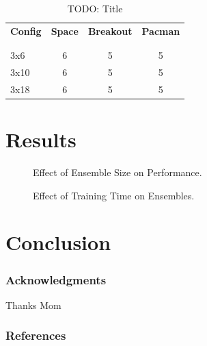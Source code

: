 \documentclass{article} %
\begin{document}
\begin{table}[H]
\caption{TODO: Title}
\label{sample-table}
\begin{center}
    \begin{tabular}{l | ccc}
        {\bf Config} & \multicolumn{1}{c}{\bf Space}  & \multicolumn{1}{c}{\bf Breakout} & \multicolumn{1}{c}{\bf Pacman} \\
        \\ \hline \\
        3x6     &6 &5 &5 \\
        3x10    &6 &5 &5 \\
        3x18    &6 &5 &5 \\
    \end{tabular}
\end{center}
\end{table}


\section{Results}

\begin{figure}[H]
\begin{center}
\fbox{\rule[-.5cm]{0cm}{4cm} \rule[-.5cm]{4cm}{0cm}}
\end{center}
\caption{Effect of Ensemble Size on Performance.}
\end{figure}

\begin{figure}[H]
\begin{center}
\fbox{\rule[-.5cm]{0cm}{4cm} \rule[-.5cm]{4cm}{0cm}}
\end{center}
\caption{Effect of Training Time on Ensembles.}
\end{figure}


\section{Conclusion}
\subsubsection*{Acknowledgments}
Thanks Mom

\subsubsection*{References}
\end{document}
